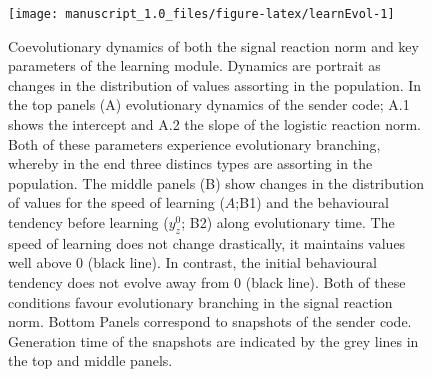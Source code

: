 \documentclass[
  12pt,
]{article}
\begin{document}
\begin{figure}

{\centering \texttt{[image: manuscript\_1.0\_files/figure-latex/learnEvol-1]} 

}

\caption{Coevolutionary dynamics of both the signal reaction norm and key parameters of the learning module. Dynamics are portrait as changes in the distribution of values assorting in the population. In the top panels (A)  evolutionary dynamics of the sender code; A.1 shows the intercept and A.2 the slope of the logistic reaction norm. Both of these parameters experience evolutionary branching, whereby in the end three distincs types are assorting in the population. The middle panels (B) show changes in the distribution of values for the speed of learning ($A$;B1) and the behavioural tendency before learning ($y_z^0$; B2) along evolutionary time. The speed of learning does not change drastically, it maintains values well above 0 (black line). In contrast, the initial behavioural tendency does not evolve away from 0 (black line). Both of these conditions favour evolutionary branching in the signal reaction norm. Bottom Panels correspond to snapshots of the sender code. Generation time of the snapshots are indicated by the grey lines in the top and middle panels.}\label{fig:learnEvol}
\end{figure}

\newpage
\small
\end{document}
